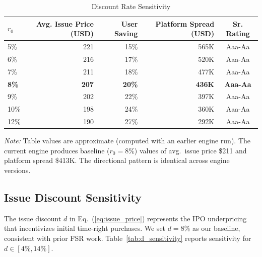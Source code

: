 \documentclass[12pt,a4paper]{article}
\begin{document}
\begin{table}[H]
\centering
\caption{Discount Rate Sensitivity}
\label{tab:r0_sensitivity}
\small
\begin{tabular}{lrrrc}
\toprule
$r_0$ & \textbf{Avg. Issue Price (USD)} & \textbf{User Saving} & \textbf{Platform Spread (USD)} & \textbf{Sr. Rating} \\
\midrule
5\% & 221 & 15\% & 565K & Aaa-Aa \\
6\% & 216 & 17\% & 520K & Aaa-Aa \\
7\% & 211 & 18\% & 477K & Aaa-Aa \\
\textbf{8\%} & \textbf{207} & \textbf{20\%} & \textbf{436K} & \textbf{Aaa-Aa} \\
9\% & 202 & 22\% & 397K & Aaa-Aa \\
10\% & 198 & 24\% & 360K & Aaa-Aa \\
12\% & 190 & 27\% & 292K & Aaa-Aa \\
\bottomrule
\end{tabular}
\par\medskip\noindent\textit{Note:} Table values are approximate (computed with an earlier engine run). The current engine produces baseline ($r_0 = 8\%$) values of avg.\ issue price \$211 and platform spread \$413K. The directional pattern is identical across engine versions.
\end{table}

\subsection{Issue Discount Sensitivity}

The issue discount $d$ in Eq.~(\ref{eq:issue_price}) represents the IPO underpricing that incentivizes initial time-right purchases. We set $d = 8\%$ as our baseline, consistent with prior FSR work. Table~\ref{tab:d_sensitivity} reports sensitivity for $d \in [4\%, 14\%]$.

\begin{table}[H]
\centering
\caption{Issue Discount Sensitivity}
\label{tab:d_sensitivity}
\end{table}
\end{document}

